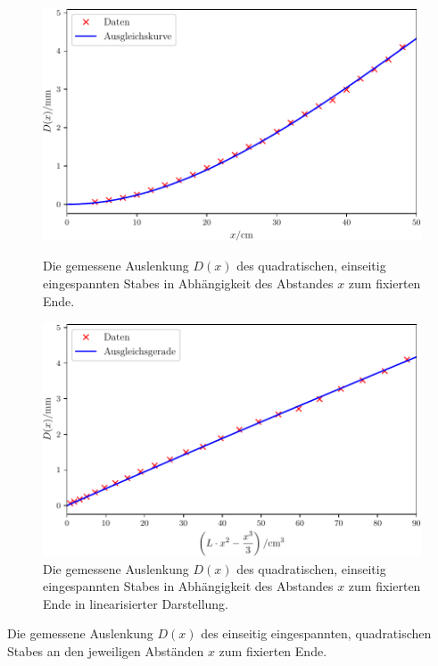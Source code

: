 \begin{figure}
	\centering
	\includegraphics[scale=.7]{content/images/StabQuadratEinseitig1.pdf}
	\caption{Die gemessene Auslenkung $D(x)$ des quadratischen, einseitig eingespannten Stabes in Abhängigkeit des Abstandes $x$ zum fixierten Ende.}
	\label{fig:quadratisch}
	\vspace{0.5cm}
	\centering
	\includegraphics[scale=.7]{content/images/StabQuadratEinseitig2.pdf}
	\caption{Die gemessene Auslenkung $D(x)$ des quadratischen, einseitig eingespannten Stabes in Abhängigkeit des Abstandes $x$ zum fixierten Ende in linearisierter Darstellung.}
	\label{fig:quadratischlinear}
\end{figure}

\begin{table}
	\caption{Die gemessene Auslenkung $D(x)$ des einseitig eingespannten, quadratischen Stabes an den jeweiligen Abständen $x$ zum fixierten Ende.}
	\begin{minipage}{0.5\textwidth}
		\centering
		
	\end{minipage}
	\begin{minipage}{0.5\textwidth}
		\centering
		
	\end{minipage}
\end{table}

